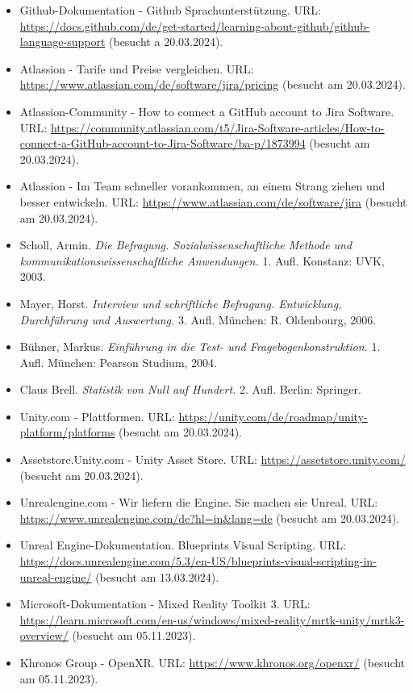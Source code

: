\begin{itemize}
    \item Github-Dokumentation - Github Sprachunterstützung. URL: \url{https://docs.github.com/de/get-started/learning-about-github/github-language-support} (besucht a 20.03.2024).
    \item Atlassion - Tarife und Preise vergleichen. URL: \url{https://www.atlassian.com/de/software/jira/pricing} (besucht am 20.03.2024).
    \item Atlassion-Community - How to connect a GitHub account to Jira Software. URL: \url{https://community.atlassian.com/t5/Jira-Software-articles/How-to-connect-a-GitHub-account-to-Jira-Software/ba-p/1873994} (besucht am 20.03.2024).
    \item Atlassion - Im Team schneller vorankommen, an einem Strang ziehen und besser entwickeln. URL: \url{https://www.atlassian.com/de/software/jira} (besucht am 20.03.2024).
    \item Scholl, Armin. \textit{Die Befragung. Sozialwissenschaftliche Methode und kommunikationswissenschaftliche Anwendungen.} 1. Aufl. Konstanz: UVK, 2003.
    \item Mayer, Horst. \textit{Interview und schriftliche Befragung. Entwicklung, Durchführung und Auswertung.} 3. Aufl. München: R. Oldenbourg, 2006.
    \item Bühner, Markus. \textit{Einführung in die Test- und Fragebogenkonstruktion.} 1. Aufl. München: Pearson Studium, 2004.
    \item Claus Brell. \textit{Statistik von Null auf Hundert.} 2. Aufl. Berlin: Springer.
    \item Unity.com - Plattformen. URL: \url{https://unity.com/de/roadmap/unity-platform/platforms} (besucht am 20.03.2024).
    \item Assetstore.Unity.com - Unity Asset Store. URL: \url{https://assetstore.unity.com/} (besucht am 20.03.2024).
    \item Unrealengine.com - Wir liefern die Engine. Sie machen sie Unreal. URL: \url{https://www.unrealengine.com/de?hl=in&lang=de} (besucht am 20.03.2024).
    \item Unreal Engine-Dokumentation. Blueprints Visual Scripting. URL: \url{https://docs.unrealengine.com/5.3/en-US/blueprints-visual-scripting-in-unreal-engine/} (besucht am 13.03.2024).
    \item Microsoft-Dokumentation - Mixed Reality Toolkit 3. URL: \url{https://learn.microsoft.com/en-us/windows/mixed-reality/mrtk-unity/mrtk3-overview/} (besucht am 05.11.2023).
    \item Khronos Group - OpenXR. URL: \url{https://www.khronos.org/openxr/} (besucht am 05.11.2023).

\end{itemize}
